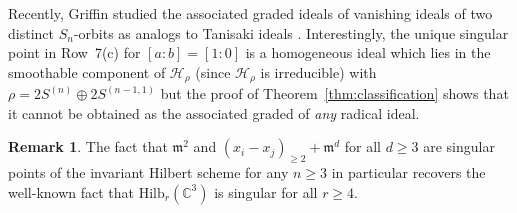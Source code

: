 \documentclass[11pt]{amsart}
\theoremstyle{definition}
\newtheorem{remark}[theorem]{Remark}
\newcommand{\CC}{\mathbb{C}}
\newcommand{\mm}{\mathfrak{m}}
\newcommand{\HH}{\mathcal{H}}
\begin{document}
Recently, Griffin studied the associated graded ideals of vanishing ideals of two distinct $S_n$-orbits as analogs to Tanisaki ideals \cite{griffin2022orbit}. Interestingly, the unique singular point in Row~7(c) for $[a:b] = [1:0]$ is a homogeneous ideal which lies in the smoothable component of $\HH_\rho$ (since $\HH_\rho$ is irreducible) with $\rho = 2S^{(n)} \oplus 2 S^{(n-1,1)}$ but the proof of Theorem~\ref{thm:classification} shows that it cannot be obtained as the associated graded of \emph{any} radical ideal.

\begin{remark}
    The fact that $\mm^2$ and $(x_i-x_j)_{\geq 2} + \mm^d$ for all $d \geq 3$ are singular points of the invariant Hilbert scheme for any $n \geq 3$ in particular recovers the well-known fact that $\mathrm{Hilb}_r(\CC^3)$ is singular for all $r \geq 4$. 
\end{remark}
\end{document}
